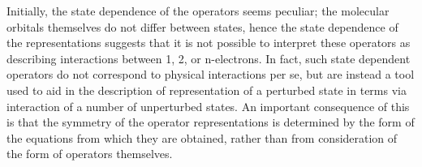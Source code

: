 \noindent Initially, the state dependence of the operators seems peculiar; the
molecular orbitals themselves do not differ between states, hence the state
dependence of the representations suggests that it is not possible to interpret
these operators as describing interactions between 1, 2, or n-electrons.  In
fact, such state dependent operators do not correspond to physical interactions
per se, but are instead a tool used to aid in the description of representation
of a perturbed state in terms via interaction of a number of unperturbed states.
An important consequence of this is that the symmetry of the operator
representations is determined by the form of the equations from which they are
obtained, rather than from consideration of the form of operators themselves.
